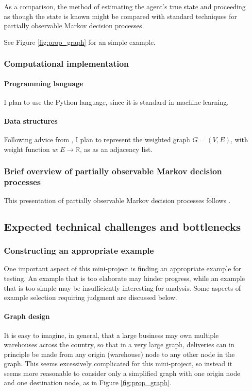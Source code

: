 As a comparison, the method of estimating the agent's true state and proceeding as though the state is known might be compared with standard techniques for partially observable Markov decision processes.

See Figure \ref{fig:prop_graph} for an simple example.

\subsubsection{Computational implementation}

\paragraph{Programming language} I plan to use the Python language, since it is standard in machine learning.

\paragraph{Data structures} Following advice from \cite[Ch. 20]{clrs}, I plan to represent the weighted graph $G = (V, E)$, with weight function $w \colon E \to \mathbb R$, as as an adjacency list.

\subsubsection{Brief overview of partially observable Markov decision processes} This presentation of partially observable Markov decision processes follows \cite[Ch. 12]{rl_sota}.

\subsection{Expected technical challenges and bottlenecks}

\subsubsection{Constructing an appropriate example}

One important aspect of this mini-project is finding an appropriate example for testing. An example that is too elaborate may hinder progress, while an example that is too simple may be insufficiently interesting for analysis. Some aspects of example selection requiring judgment are discussed below.

\paragraph{Graph design} It is easy to imagine, in general, that a large business may own multiple warehouses across the country, so that in a very large graph, deliveries can in principle be made from any origin (warehouse) node to any other node in the graph. This seems excessively complicated for this mini-project, so instead it seems more reasonable to consider only a simplified graph with one origin node and one destination node, as in Figure \ref{fig:prop_graph}.

